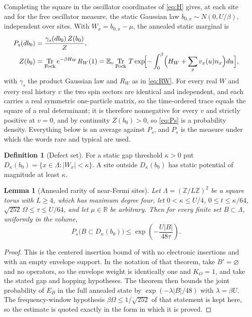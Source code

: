 \documentclass[11pt]{article}
\newtheorem{lemma}[theorem]{Lemma}
\theoremstyle{definition}
\newtheorem{definition}[theorem]{Definition}
\theoremstyle{remark}
\DeclareMathOperator{\Tr}{Tr}
\newcommand{\E}{\mathbb{E}}
\newcommand{\R}{\mathbb{R}}
\begin{document}
Completing the square in the oscillator coordinates of \eqref{eq:H} gives, at each
site and for the free oscillator measure, the static Gaussian law
$b_{0,x}\sim N(0,U/\beta)$, independent over sites. With $W_x=b_{0,x}-\mu$, the
annealed static marginal is
\begin{equation}
\begin{aligned}
P_s(db_0)&=\frac{\gamma_s(db_0)\,Z(b_0)}{Z},\\
Z(b_0)&=\Tr_{\mathrm{Fock}}e^{-\beta H_W}R_W(1)
=\E_v\Tr_{\mathrm{Fock}}\,T\exp\!\Bigl[-\int_0^\beta\Bigl(H_W+\sum_xv_x(u)n_x\Bigr)du\Bigr],
\end{aligned}
\label{eq:Ps}
\end{equation}
with $\gamma_s$ the product Gaussian law and $R_W$ as in \eqref{eq:RW}. For every
real $W$ and every real history $v$ the two spin sectors are identical and
independent, and each carries a real symmetric one-particle matrix, so the
time-ordered trace equals the square of a real determinant; it is therefore
nonnegative for every $v$ and strictly positive at $v=0$, and by continuity
$Z(b_0)>0$, so \eqref{eq:Ps} is a probability density. Everything below is an average against $P_s$, and $P_s$ is the
measure under which the words rare and typical are used.

\begin{definition}[Defect set]
\label{def:defect}
For a static gap threshold $\kappa>0$ put $D_\kappa(b_0)=\{x\in\Lambda:
|W_x|<\kappa\}$. A site outside $D_\kappa(b_0)$ has static potential of magnitude at
least $\kappa$.
\end{definition}

\begin{lemma}[Annealed rarity of near-Fermi sites]
\label{lem:rarity}
Let $\Lambda=(\mathbb{Z}/L\mathbb{Z})^2$ be a square torus with $L\ge4$, which has maximum degree
four, let $0<\kappa\le U/4$, $0\le t\le\kappa/64$, $\sqrt{252}\,\Omega\le\tau\le U/64$,
and let $\mu\in\R$ be arbitrary. Then for every finite set $B\subset\Lambda$, uniformly in
the volume,
\begin{equation}
P_s\bigl(B\subset D_\kappa(b_0)\bigr)\le\exp\!\left(-\frac{U|B|}{48\tau}\right).
\label{eq:rarity}
\end{equation}
\end{lemma}

\begin{proof}
This is the centered insertion bound of \cite{limits} with no electronic insertions
and with an empty envelope support. In the notation of that theorem, take $B'=\varnothing$
and no operators, so the envelope weight is identically one and $K_O=1$, and take the
stated gap and hopping hypotheses. The theorem then bounds the joint probability of
$E_B$ in the full annealed state by $\exp(-\lambda|B|/48)$ with $\lambda=\beta U$.
The frequency-window hypothesis $\beta\Omega\le1/\sqrt{252}$ of that statement is
kept here, so the estimate is quoted exactly in the form in which it is proved.
\end{proof}
\end{document}
